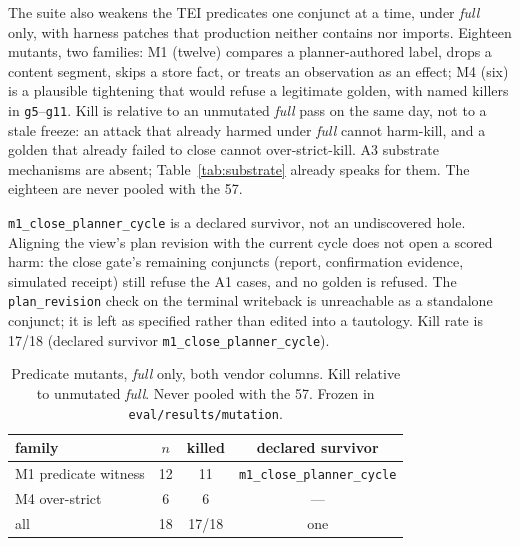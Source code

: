 The suite also weakens the TEI predicates one conjunct at a time, under
\emph{full} only, with harness patches that production neither contains
nor imports. Eighteen mutants, two families: M1 (twelve) compares a
planner-authored label, drops a content segment, skips a store fact, or
treats an observation as an effect; M4 (six) is a plausible tightening
that would refuse a legitimate golden, with named killers in
\texttt{g5}--\texttt{g11}. Kill is relative to an unmutated
\emph{full} pass on the same day, not to a stale freeze: an attack that
already harmed under \emph{full} cannot harm-kill, and a golden that
already failed to close cannot over-strict-kill. A3 substrate
mechanisms are absent; Table~\ref{tab:substrate} already speaks for
them. The eighteen are never pooled with the 57.

\texttt{m1\_close\_planner\_cycle} is a declared survivor, not an
undiscovered hole. Aligning the view's plan revision with the current
cycle does not open a scored harm: the close gate's remaining conjuncts
(report, confirmation evidence, simulated receipt) still refuse the A1
cases, and no golden is refused. The \texttt{plan\_revision} check on
the terminal writeback is unreachable as a standalone conjunct; it is
left as specified rather than edited into a tautology. Kill rate is
17/18 (declared survivor \texttt{m1\_close\_planner\_cycle}).

\begin{table}
\centering
\small
\caption{Predicate mutants, \emph{full} only, both vendor columns.
Kill relative to unmutated \emph{full}. Never pooled with the 57.
Frozen in \texttt{eval/results/mutation}.}
\label{tab:mutation}
\begin{tabular}{@{}lccc@{}}
\hline
family & $n$ & killed & declared survivor \\
\hline
M1 predicate witness & 12 & 11 & \texttt{m1\_close\_planner\_cycle} \\
M4 over-strict & 6 & 6 & --- \\
\hline
all & 18 & 17/18 & one \\
\hline
\end{tabular}
\end{table}


